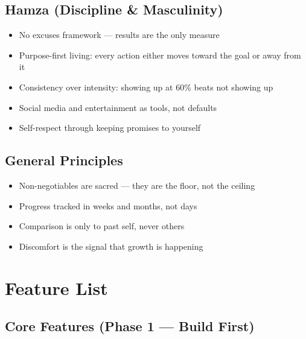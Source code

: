 \documentclass[12pt, a4paper]{article}
\begin{document}
\subsection{Hamza (Discipline \& Masculinity)}
\begin{itemize}[noitemsep]
    \item No excuses framework --- results are the only measure
    \item Purpose-first living: every action either moves toward the goal or away from it
    \item Consistency over intensity: showing up at 60\% beats not showing up
    \item Social media and entertainment as tools, not defaults
    \item Self-respect through keeping promises to yourself
\end{itemize}

\subsection{General Principles}
\begin{itemize}[noitemsep]
    \item Non-negotiables are sacred --- they are the floor, not the ceiling
    \item Progress tracked in weeks and months, not days
    \item Comparison is only to past self, never others
    \item Discomfort is the signal that growth is happening
\end{itemize}

\section{Feature List}

\subsection{Core Features (Phase 1 --- Build First)}
\end{document}
